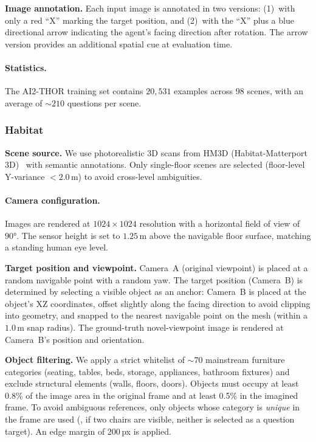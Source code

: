 \noindent\textbf{Image annotation.}
Each input image is annotated in two versions: (1)~with only a red ``X'' marking the target position, and (2)~with the ``X'' plus a blue directional arrow indicating the agent's facing direction after rotation.
The arrow version provides an additional spatial cue at evaluation time.

\paragraph{Statistics.}
The AI2-THOR training set contains $20{,}531$ examples across 98 scenes, with an average of ${\sim}210$ questions per scene.

\subsubsection{Habitat}

\noindent\textbf{Scene source.}
We use photorealistic 3D scans from HM3D (Habitat-Matterport 3D)~\cite{chang2017matterport3d} with semantic annotations.
Only single-floor scenes are selected (floor-level Y-variance $< 2.0$\,m) to avoid cross-level ambiguities.

\paragraph{Camera configuration.}
Images are rendered at $1024 \times 1024$ resolution with a horizontal field of view of $90°$.
The sensor height is set to $1.25$\,m above the navigable floor surface, matching a standing human eye level.

\noindent\textbf{Target position and viewpoint.}
Camera~A (original viewpoint) is placed at a random navigable point with a random yaw.
The target position (Camera~B) is determined by selecting a visible object as an anchor: Camera~B is placed at the object's XZ coordinates, offset slightly along the facing direction to avoid clipping into geometry, and snapped to the nearest navigable point on the mesh (within a $1.0$\,m snap radius).
The ground-truth novel-viewpoint image is rendered at Camera~B's position and orientation.

\noindent\textbf{Object filtering.}
We apply a strict whitelist of ${\sim}70$ mainstream furniture categories (seating, tables, beds, storage, appliances, bathroom fixtures) and exclude structural elements (walls, floors, doors).
Objects must occupy at least 0.8\% of the image area in the original frame and at least 0.5\% in the imagined frame.
To avoid ambiguous references, only objects whose category is \emph{unique} in the frame are used (\eg, if two chairs are visible, neither is selected as a question target).
An edge margin of 200\,px is applied.

